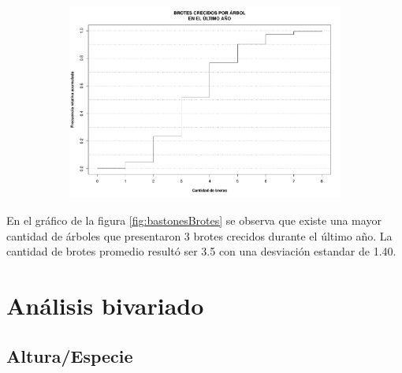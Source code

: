 \documentclass[11pt]{article}
\begin{document}
\begin{figure}[h!]
  \ContinuedFloat
  \begin{center}
    \begin{subfigure}[b]{0.9\linewidth}
      \includegraphics[width=\linewidth]{acumBrotes.pdf}
      \caption{}
      \label{fig:acumBrotes}
    \end{subfigure}
    \caption{}
  \end{center}
\end{figure}

\newpage

\begin{justify}
  En el gráfico de la figura \ref{fig:bastonesBrotes} se observa que
  existe una mayor cantidad de árboles que presentaron 3 brotes crecidos
  durante el último año. La cantidad de brotes promedio resultó ser 3.5
  con una desviación estandar de 1.40.
\end{justify}


\newpage
\section{Análisis bivariado}

\subsection{Altura/Especie}
\end{document}
